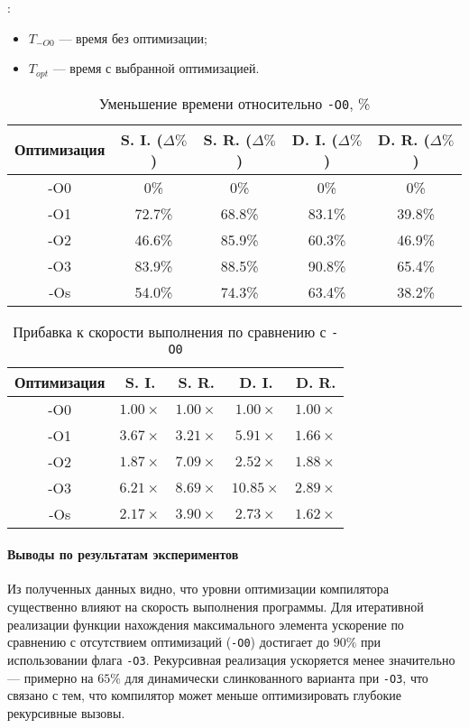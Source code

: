 :
\begin{itemize}
  \item $T_{-O0}$ --- время без оптимизации;
  \item $T_{opt}$ --- время с выбранной оптимизацией.
\end{itemize}

\begin{table}[H]
\centering
\caption{Уменьшение времени относительно \texttt{-O0}, \%}
\begin{tabular}{|c|c|c|c|c|}
\hline
Оптимизация & S. I. ($\Delta\%$) & S. R. ($\Delta\%$) & D. I. ($\Delta\%$) & D. R. ($\Delta\%$)\\
\hline
-O0 & 0\% & 0\% & 0\% & 0\% \\
-O1 & 72.7\% & 68.8\% & 83.1\% & 39.8\% \\
-O2 & 46.6\% & 85.9\% & 60.3\% & 46.9\% \\
-O3 & 83.9\% & 88.5\% & 90.8\% & 65.4\% \\
-Os & 54.0\% & 74.3\% & 63.4\% & 38.2\% \\
\hline
\end{tabular}
\end{table}

\begin{table}[H]
\centering
\caption{Прибавка к скорости выполнения по сравнению с \texttt{-O0}}
\begin{tabular}{|c|c|c|c|c|}
\hline
Оптимизация & S. I. & S. R. & D. I. & D. R. \\
\hline
-O0 & $1.00\times$ & $1.00\times$ & $1.00\times$ & $1.00\times$ \\
-O1 & $3.67\times$ & $3.21\times$ & $5.91\times$ & $1.66\times$ \\
-O2 & $1.87\times$ & $7.09\times$ & $2.52\times$ & $1.88\times$ \\
-O3 & $6.21\times$ & $8.69\times$ & $10.85\times$ & $2.89\times$ \\
-Os & $2.17\times$ & $3.90\times$ & $2.73\times$ & $1.62\times$ \\
\hline
\end{tabular}
\end{table}


\paragraph*{Выводы по результатам экспериментов}

Из полученных данных видно, что уровни оптимизации компилятора существенно влияют на скорость выполнения программы.  
Для итеративной реализации функции нахождения максимального элемента ускорение по сравнению с отсутствием оптимизаций (\texttt{-O0}) достигает до $90\%$ при использовании флага \texttt{-O3}.  
Рекурсивная реализация ускоряется менее значительно --- примерно на $65\%$ для динамически слинкованного варианта при \texttt{-O3}, что связано с тем, что компилятор может меньше оптимизировать глубокие рекурсивные вызовы.

